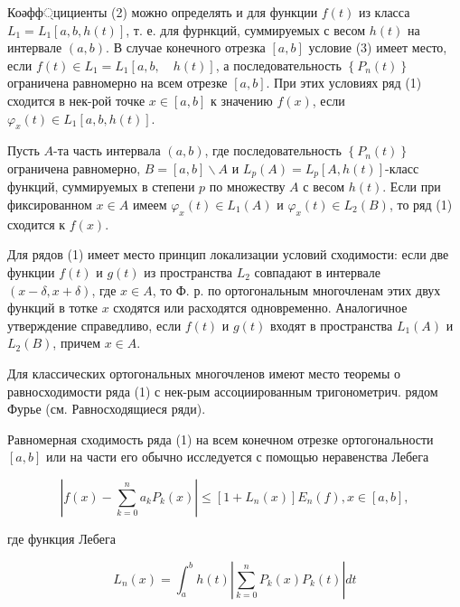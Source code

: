 \documentclass[10pt]{article}
\begin{document}
Коәфф্цициенты (2) можно определять и для функции $f(t)$ из класса $L_{1}=L_{1}[a, b, h(t)]$, т. е. для фурнкций, суммируемых с весом $h(t)$ на интервале $(a, b)$. В случае конечного отрезка $[a, b]$ условие (3) имеет место, если $f(t) \in L_{1}=L_{1}[a, b, \quad h(t)]$, а последовательность $\left\{P_{n}(t)\right\}$ ограничена равномерно на всем отрезке $[a, b]$. При этих условиях ряд (1) сходится в нек-рой точке $x \in[a, b]$ к значению $f(x)$, если $\varphi_{x}(t) \in L_{1}[a, b, h(t)]$.



Пусть $A$-та часть интервала $(a, b)$, где последовательность $\left\{P_{n}(t)\right\}$ ограничена равномерно, $B=[a, b] \backslash A$ и $L_{p}(A)=L_{p}[A, h(t)]$-класс функций, суммируемых в степени $p$ по множеству $A$ с весом $h(t)$. Если при фиксированном $x \in A$ имеем $\varphi_{x}(t) \in L_{1}(A)$ и $\varphi_{x}(t) \in L_{2}(B)$, то ряд (1) сходится к $f(x)$.



Для рядов (1) имеет место принцип локализации условий сходимости: если две функции $f(t)$ и $g(t)$ из пространства $L_{2}$ совпадают в интервале $(x-\delta, x+\delta)$, где $x \in A$, то Ф. р. по ортогональным многочленам этих двух функций в тотке $x$ сходятся или расходятся одновременно. Аналогичное утверждение справедливо, если $f(t)$ и $g(t)$ входят в пространства $L_{1}(A)$ и $L_{2}(B)$, причем $x \in A$.



Для классических ортогональных многочленов имеют место теоремы о равносходимости ряда (1) с нек-рым ассоциированным тригонометрич. рядом Фурье (см. Равносходящиеся ряди).



Равномерная сходимость ряда (1) на всем конечном отрезке ортогональности $[a, b]$ или на части его обычно исследуется с помощью неравенства Лебега



\[

\left|f(x)-\sum_{k=0}^{n} a_{k} P_{k}(x)\right| \leqslant\left[1+L_{n}(x)\right] E_{n}(f), x \in[a, b],

\]



где функция Лебега



\[

L_{n}(x)=\int_{a}^{b} h(t)\left|\sum_{k=0}^{n} P_{k}(x) P_{k}(t)\right| d t

\]
\end{document}
